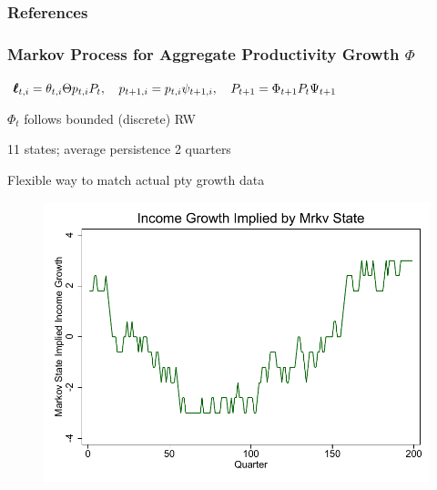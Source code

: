 \documentclass{beamer}\usepackage{dcolumn}
\begin{document}
\begin{frame}[t,allowframebreaks]
\frametitle{References}

%






\end{frame}

\normalsize



\begin{frame}
  \frametitle{Markov Process for Aggregate Productivity Growth $\Phi$}

$
\pmb{\ell}_{t,i} = \theta_{t,i}\Theta p_{t,i} {P}_{t},\quad
p_{t+1,i} =  {{p}}_{t,i} \psi_{t+1,i},  \quad
 {P}_{t+1} =  \Phi_{t+1} {P}_{t}\Psi_{t+1}
$
\bi
\item $\Phi_t$ follows bounded (discrete) RW
\item 11 states; average persistence 2 quarters
\item Flexible way to match actual pty growth data
\ei
  \begin{figure}
\begin{center}
\includegraphics[width=.75\textwidth]{../Figures/MrkvStateGrowth}
\end{center}
\end{figure}

\end{frame}
\end{document}
